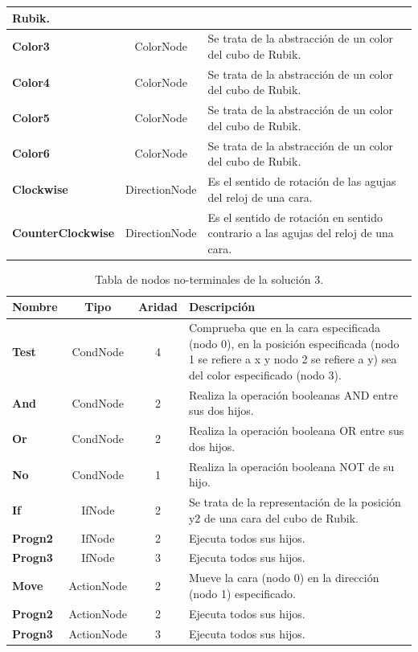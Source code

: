\begin{table}[ctb]
\begin{tabular}{lcp{8cm}}
Rubik.\\\hline
\textbf{Color3}&	ColorNode&	Se trata de la abstracción de un color del cubo de
Rubik.\\\hline
\textbf{Color4}&	ColorNode&	Se trata de la abstracción de un color del cubo de
Rubik. \\\hline
\textbf{Color5}&	ColorNode&	Se trata de la abstracción de un color del cubo de
Rubik.\\\hline
\textbf{Color6}&	ColorNode&	Se trata de la abstracción de un color del
cubo de Rubik.\\\hline
\textbf{Clockwise}&	DirectionNode&	Es el sentido de rotación de
las agujas del reloj de una cara.\\\hline
\textbf{CounterClockwise}&	DirectionNode&	Es el
sentido de rotación en sentido contrario a las agujas del reloj de una
cara.\\
\bottomrule
\end{tabular}
\end{table}

\begin{table}[ctb]
\caption{Tabla de nodos no-terminales de la solución 3.}
\label{tab:n-noterminales-sol3}
\centering
\begin{tabular}{lccp{8cm}}
\toprule
\textbf{Nombre} &\textbf{Tipo}&\textbf{Aridad}& \textbf{Descripción}\\
\midrule
\textbf{Test}&CondNode&	4	&Comprueba que en la cara especificada (nodo 0), en la
posición especificada (nodo 1 se refiere a x  y nodo 2 se refiere a  y) sea del
color especificado (nodo 3).\\\hline
\textbf{And}&	CondNode&	2&	Realiza la operación booleanas AND entre sus dos
hijos.\\\hline 
\textbf{Or}&	CondNode&	2&	Realiza la operación booleana OR entre sus
dos hijos.\\\hline
\textbf{No}& CondNode&	1&	Realiza la operación booleana NOT de su
hijo.\\\hline
\textbf{If}&IfNode&	2&	Se
trata de la representación de la posición y2 de una cara del cubo de
Rubik.\\\hline
\textbf{Progn2}&	IfNode	&2&	Ejecuta todos sus hijos.\\\hline
\textbf{Progn3}&	IfNode	&3&	Ejecuta todos sus hijos.\\\hline
\textbf{Move}	&ActionNode	&2&	Mueve la cara (nodo 0) en la dirección (nodo 1)
especificado.\\\hline
\textbf{Progn2}&	ActionNode	&2&	Ejecuta todos sus hijos.\\\hline
\textbf{Progn3}&	ActionNode	&3&	Ejecuta todos sus hijos.\\
\bottomrule
\end{tabular}
\end{table}

